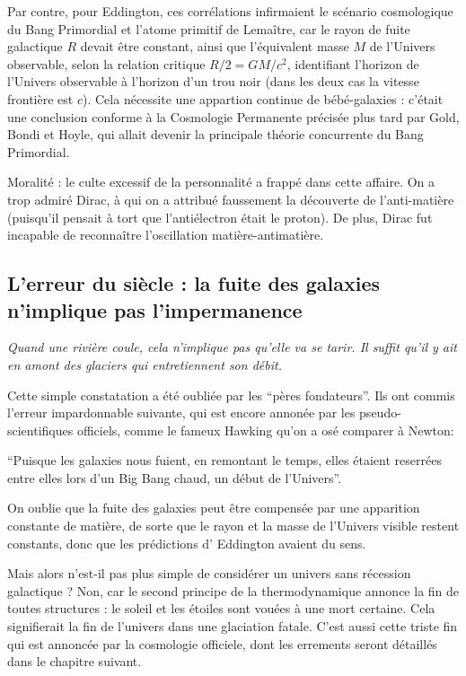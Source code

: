 \documentclass[a4paper,12pt]{article}
\begin{document}
     Par contre, pour Eddington, ces corrélations infirmaient le scénario cosmologique du Bang Primordial et l'atome primitif de Lemaître, car le rayon de fuite galactique $R$ devait être constant, ainsi que l'équivalent masse $M$ de l'Univers observable, selon la relation critique  $R/2 = GM/c^2$, identifiant l'horizon de l'Univers observable à l'horizon d'un trou noir (dans les deux cas la vitesse frontière est $c$). Cela nécessite une appartion continue de bébé-galaxies : c'était une conclusion conforme à la Cosmologie Permanente précisée plus tard par Gold, Bondi et Hoyle, qui allait devenir la principale théorie concurrente du Bang Primordial. 

Moralité : le culte excessif de la personnalité a frappé dans cette affaire. On a trop admiré Dirac, à qui on a attribué faussement la découverte de l’anti-matière (puisqu’il pensait à tort que l’antiélectron était le proton). De plus, Dirac fut incapable de reconnaître l'oscillation matière-antimatière.


\subsection{L'erreur du siècle : la fuite des galaxies n'implique pas l'impermanence}

    \textit{ Quand une rivière coule, cela n'implique pas qu'elle va se tarir. Il suffit qu'il y ait en amont des glaciers qui entretiennent son débit.}
     

Cette simple constatation a été oubliée par les ``pères fondateurs''. Ils ont commis l'erreur impardonnable suivante, qui est encore annonée par les pseudo-scientifiques officiels, comme le fameux Hawking qu'on a osé comparer à Newton:

``Puisque les galaxies nous fuient, en remontant le temps, elles étaient reserrées entre elles lors d'un Big Bang chaud, un début de l'Univers''.

On oublie que la fuite des galaxies peut être compensée par une apparition constante de matière, de sorte que le rayon et la masse de l'Univers visible restent constants, donc que les prédictions d' Eddington avaient du sens.

Mais alors n'est-il pas plus simple de considérer un univers sans récession galactique ? Non, car le second principe de la thermodynamique annonce la fin de toutes structures : le soleil et les étoiles sont vouées à une mort certaine. Cela signifierait la fin de l'univers dans une glaciation fatale.  C'est aussi cette triste fin qui est annoncée par la cosmologie officiele, dont les errements seront détaillés dans le chapitre suivant.
\end{document}
